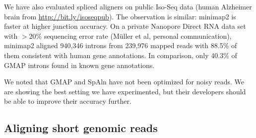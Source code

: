 \documentclass{bioinfo}
\begin{document}
We have also evaluated spliced aligners on public Iso-Seq data (human Alzheimer
brain from \href{http://bit.ly/isoseqpub}{http://bit.ly/isoseqpub}). The
observation is similar: minimap2 is faster at higher junction accuracy.
On a private Nanopore Direct RNA data set with $>$20\% sequencing error rate
(M\"{u}ller et al, personal communication), minimap2 aligned 940,346 introns
from 239,976 mapped reads with 88.5\% of them consistent with human gene
annotations. In comparison, only 40.3\% of GMAP introns found in known gene
annotations.

We noted that GMAP and SpAln have not been optimized for noisy reads. We are
showing the best setting we have experimented, but their developers should be
able to improve their accuracy further.


\subsection{Aligning short genomic reads}
\end{document}
